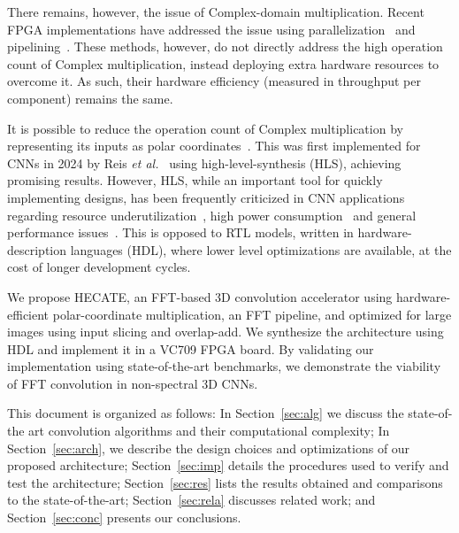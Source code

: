 \documentclass[
  10pt,
  \FORMAT-MODE,
  \REVIEW-MODE,
  \TWOSIDE-MODE
]{IEEEtran}
\begin{document}
  There remains, however, the issue of Complex-domain multiplication. Recent FPGA implementations have addressed the issue using parallelization~\cite{li2024split} and pipelining~\cite{fan2021high}. These methods, however, do not directly address the high operation count of Complex multiplication, instead deploying extra hardware resources to overcome it. As such, their hardware efficiency (measured in throughput per component) remains the same.

  It is possible to reduce the operation count of Complex multiplication by representing its inputs as polar coordinates~\cite{lera2023hardware}. This was first implemented for CNNs in 2024 by Reis \textit{et al.}~\cite{reis2024phasor} using high-level-synthesis (HLS), achieving promising results. However, HLS, while an important tool for quickly implementing designs, has been frequently criticized in CNN applications regarding resource underutilization~\cite{xu2024flare,jiang2025fpga,antunes2025fpga}, high power consumption~\cite{salman2020comparative} and general performance issues~\cite{faber2022challenges,ahmed2023autohls,lau2024rapidstream}. This is opposed to RTL models, written in hardware-description languages (HDL), where lower level optimizations are available, at the cost of longer development cycles.

  \ifCLASSOPTIONcompsoc\else %
    \IEEEpubidadjcol
  \fi
  
  We propose HECATE, an FFT-based 3D convolution accelerator using hardware-efficient polar-coordinate multiplication, an FFT pipeline, and optimized for large images using input slicing and overlap-add. We synthesize the architecture using HDL and implement it in a VC709 FPGA board. By validating our implementation using state-of-the-art benchmarks, we demonstrate the viability of FFT convolution in non-spectral 3D CNNs.
  
  This document is organized as follows: In Section~\ref{sec:alg} we discuss the state-of-the art convolution algorithms and their computational complexity; In Section~\ref{sec:arch}, we describe the design choices and optimizations of our proposed architecture; Section~\ref{sec:imp} details the procedures used to verify and test the architecture; Section~\ref{sec:res} lists the results obtained and comparisons to the state-of-the-art; Section~\ref{sec:rela} discusses related work; and Section~\ref{sec:conc} presents our conclusions.

\end{document}
